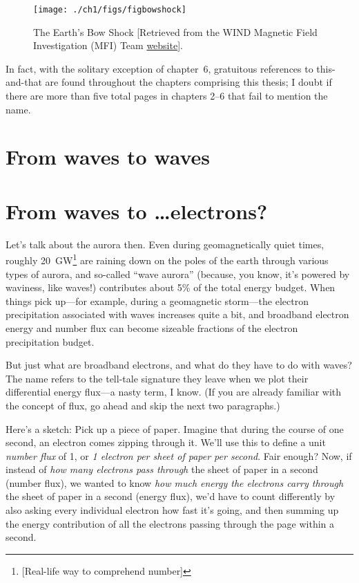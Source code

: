 
  \begin{figure}
    \centering
    \noindent\texttt{[image: ./ch1/figs/figbowshock]}
    \caption[The Earth's Bow Shock]{The Earth's Bow Shock [Retrieved
      from the WIND Magnetic Field Investigation (MFI) Team
      \href{https://wind.nasa.gov/mfi/team_sciencea.html}{website}].}
    \label{ch1:FigBowShock}
  \end{figure}


  In fact, with the solitary exception of chapter~6, gratuitous
  references to \Alf this-and-that are found throughout the chapters
  comprising this thesis; I doubt if there are more than five total
  pages in chapters 2--6 that fail to mention the name.


\section{From waves to waves}



\section{From waves to \dots  electrons?}

Let's talk about the aurora then. Even during geomagnetically quiet
times, roughly 20~GW\footnote{[Real-life way to comprehend number]}
\citep{Newell2009} are raining down on the poles of the earth through
various types of aurora, and so-called ``wave aurora'' (because, you
know, it's powered by waviness, like \Alf waves!) contributes about
5\% of the total energy budget. When things pick up---for example,
during a geomagnetic storm---the electron precipitation associated with
\Alf waves increases quite a bit, and broadband electron energy and
number flux can become sizeable fractions of the electron
precipitation budget.

But just what are broadband electrons, and what do they have to do
with \Alf waves? The name refers to the tell-tale signature they leave
when we plot their differential energy flux---a nasty term, I
know. (If you are already familiar with the concept of flux, go ahead
and skip the next two paragraphs.) 

Here's a sketch: Pick up a piece of paper. Imagine that during the
course of one second, an electron comes zipping through it. We'll use
this to define a unit \emph{number flux} of 1, or \emph {1 electron
  per sheet of paper per second}. Fair enough? Now, if instead of
\emph{how many electrons pass through} the sheet of paper in a second
(number flux), we wanted to know \emph{how much energy the electrons
  carry through} the sheet of paper in a second (energy flux), we'd
have to count differently by also asking every individual electron how
fast it's going, and then summing up the energy contribution of all
the electrons passing through the page within a second.

